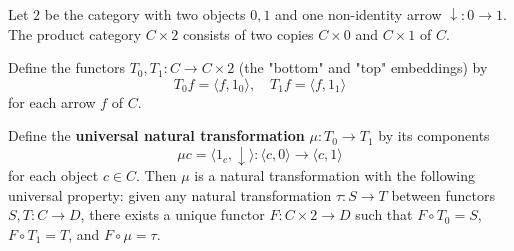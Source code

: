 Let $2$ be the category with two objects $0, 1$ and one non-identity arrow $\downarrow: 0 \to 1$. The product category $C \times 2$ consists of two copies $C \times 0$ and $C \times 1$ of $C$.

Define the functors $T_0, T_1: C \to C \times 2$ (the "bottom" and "top" embeddings) by
$$T_0 f = \langle f, 1_0 \rangle, \quad T_1 f = \langle f, 1_1 \rangle$$
for each arrow $f$ of $C$.

Define the \textbf{universal natural transformation} $\mu: T_0 \to T_1$ by its components
$$\mu c = \langle 1_c, \downarrow \rangle: \langle c, 0 \rangle \to \langle c, 1 \rangle$$
for each object $c \in C$. Then $\mu$ is a natural transformation with the following universal property: given any natural transformation $\tau: S \to T$ between functors $S, T: C \to D$, there exists a unique functor $F: C \times 2 \to D$ such that $F \circ T_0 = S$, $F \circ T_1 = T$, and $F \circ \mu = \tau$.
